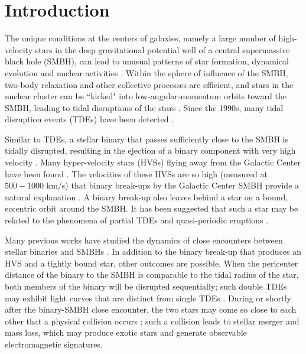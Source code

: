 \documentclass[twocolumn]{aastex631}
\begin{document}


\section{Introduction} 
\label{sec:intro}

The unique conditions at the centers of galaxies, namely a large number of high-velocity stars in the deep gravitational potential well of a central supermassive black hole (SMBH), can lead to unusual patterns of star formation, dynamical evolution and nuclear activities \citep[e.g.,][]{Alexander2017ARAA}.
Within the sphere of influence of the SMBH, two-body relaxation and other collective processes are efficient, and stars in the nuclear cluster can be ``kicked" into low-angular-momentum orbits toward the SMBH, leading to tidal disruptions of the stars \citep{Rees1988nature,Stone2020SSRv}. 
Since the 1990s, many tidal disruption events (TDEs) have been detected \citep{Van2020SSRv,Gezari2021ARAA}.

Similar to TDEs, a stellar binary that passes sufficiently close to the SMBH is tidally disrupted, resulting in the ejection of a binary component with very high velocity \citep{Hills1988Nature}. 
Many hyper-velocity stars (HVSs) flying away from the Galactic Center have been found \citep[e.g.][]{Brown2005ApJ}. 
The velocities of these HVSs are so high (measured at $500-1000$ km/s) that binary break-ups by the Galactic Center SMBH provide a natural explanation \citep{Yu2003ApJ,Gould2003ApJ}.
A binary break-up also leaves behind a star on a bound, eccentric orbit around the SMBH. 
It has been suggested that such a star may be related to the phenomena of partial TDEs \citep{cufari2022ApJL,Somalwar2023arXiv} 
and quasi-periodic eruptions \citep{Lu2023MNRAS,Linial2023ApJ,Zhou2024arXiv}.

Many previous works have studied the dynamics of close encounters between stellar binaries and SMBHs \citep[e.g.,][]{Gualandris2005MNRAS,Bromley2006ApJ,Ginsburg2006MNRAS,Sesana2007ApJ,Sari2010ApJ,Brown2018MNRAS}. 
In addition to the binary break-up that produces an HVS and a tightly bound star, other outcomes are possible. 
When the pericenter distance of the binary to the SMBH is comparable to the tidal radius of the star, 
both members of the binary will be disrupted sequentially; such double TDEs may exhibit light curves that are distinct from single TDEs \citep{Mandel2015ApJL}.
During or shortly after the binary-SMBH close encounter, the two stars may come so close to each other that a physical collision occurs
\citep{Ginsburg2007MNRAS}; such a collision leads to stellar merger and mass loss, which may produce exotic stars and generate observable electromagnetic signatures.
\end{document}
